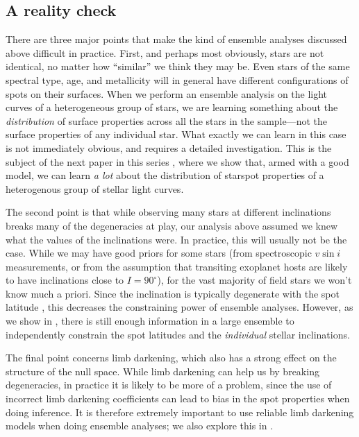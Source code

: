 \documentclass[modern]{aastex62}
\begin{document}
\subsection{A reality check}
\label{sec:reality-check}

There are three major points that make the kind of ensemble
analyses discussed above difficult in practice. First, and perhaps
most obviously, stars are
not identical, no matter how ``similar'' we think they may be.
Even stars of the same spectral type, age, and metallicity will
in general have different configurations of spots on their surfaces.
When we perform an ensemble analysis on the light curves of a
heterogeneous group of stars, we are learning something about the
\emph{distribution} of surface properties across all the stars in
the sample---not the surface properties of any individual star.
What exactly we can learn in this case is not immediately obvious,
and requires a detailed investigation. This is the subject of
the next paper in this series , where we show that,
armed with a good model,
we can learn \emph{a lot} about the distribution of starspot
properties of a heterogenous group of stellar light curves.

The second point is that while observing many stars at different
inclinations breaks many of the degeneracies at play, our analysis
above assumed we knew what the values of the inclinations were.
In practice, this will usually not be the case. While we may have
good priors for some stars (from spectroscopic $v\sin i$ measurements,
or from the assumption that transiting exoplanet hosts are likely
to have inclinations close to $I=90^\circ$), for the vast majority
of field stars we won't know much a priori. Since the inclination
is typically degenerate with the spot latitude \citep[e.g.,][]{Walkowicz2013},
this decreases the constraining power of ensemble analyses.
However, as we show in , there is still enough
information in a large ensemble to independently constrain the spot latitudes
and the \emph{individual} stellar inclinations.

The final point concerns limb darkening, which also has a strong
effect on the structure of the null space. While limb darkening can
help us by breaking degeneracies, in practice it is likely to be more
of a problem, since the use of incorrect limb darkening coefficients can lead
to bias in the spot properties when doing inference.
It is therefore extremely important to use reliable limb darkening models
when doing ensemble analyses; we also explore this in .
\end{document}
